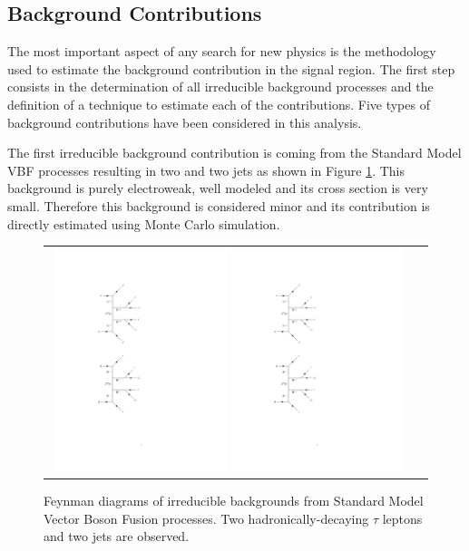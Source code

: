 \subsection{Background Contributions}
\label{sec::bg_contributions}

The most important aspect of any search for new physics is the methodology used to estimate the background contribution in the signal region. The first step consists in the determination of all irreducible background processes and the definition of a technique to estimate each of the contributions. Five types of background contributions have been considered in this analysis. 

The first irreducible background contribution is coming from the Standard Model VBF processes resulting in two \hadtau and two jets as shown in Figure \ref{fig:background_SMVBF}. This background is purely electroweak, well modeled and its cross section is very small. Therefore this background is considered minor and its contribution is directly estimated using Monte Carlo simulation.

\begin{figure}[tbh!]
	\centering
	\begin{tabular}{cc}
		\includegraphics[width=0.48\textwidth]{diagrams/pics/background_SMVBFminus.pdf}
		\includegraphics[width=0.48\textwidth]{diagrams/pics/background_SMVBFplus.pdf} 		
	\end{tabular}
	\caption{Feynman diagrams of irreducible backgrounds from Standard Model Vector Boson Fusion processes. Two hadronically-decaying $\tau$ leptons and two jets are observed. }
	\label{fig:background_SMVBF}
\end{figure}

